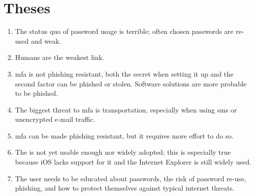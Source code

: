 \chapter*{Theses}
\thispagestyle{noheader}


\begin{enumerate}
	\setlength{\itemsep}{1cm}
	\item The status quo of password usage is terrible; often chosen passwords are re-used and weak.
	\item Humans are the weakest link.
	\item \Glsdesc{mfa} is not phishing resistant, both the secret when setting it up and the second factor can be phished or stolen. Software solutions are more probable to be phished.
	\item The biggest threat to \glsdesc{mfa} is transportation, especially when using \gls{sms} or unencrypted e-mail traffic.
	\item \Glsdesc{mfa} can be made phishing resistant, but it requires more effort to do so.
	\item The \wa{} is not yet usable enough nor widely adopted; this is especially true because iOS lacks support for it and the Internet Explorer is still widely used.
	\item The user needs to be educated about passwords, the risk of password re-use, phishing, and how to protect themselves against typical internet threats.
\end{enumerate}

